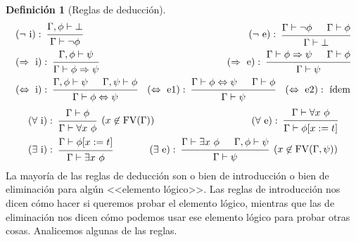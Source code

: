 \documentclass[a4paper, 12pt]{report}
\newcommand{\Ra}{\Rightarrow}
\newcommand{\te}{\text}
\newcommand{\Lra}{\Leftrightarrow}
\theoremstyle{definition}
\newtheorem{definicion}[teorema]{Definición}
\begin{document}
\begin{definicion}[Reglas de deducción]
\begin{align*}
	&(\lnot\te{ i}):~\begin{prooftree}
		\hypo{\Gamma,\phi\vdash\bot}\infer1{\Gamma\vdash\lnot\phi}
	\end{prooftree}&(\lnot\te{ e}):~\begin{prooftree}
		\hypo{\Gamma\vdash\lnot\phi}\hypo{\Gamma\vdash\phi}\infer2{\Gamma\vdash\bot}
	\end{prooftree}\\
	&(\Ra\te{ i}):~\begin{prooftree}
		\hypo{\Gamma,\phi\vdash\psi}\infer1{\Gamma\vdash\phi\Ra\psi}
	\end{prooftree}&(\Ra\te{ e}):~\begin{prooftree}
		\hypo{\Gamma\vdash\phi\Ra\psi}\hypo{\Gamma\vdash\phi}\infer2{\Gamma\vdash\psi}
	\end{prooftree}\\
	&(\Lra\te{ i}):~\begin{prooftree}
		\hypo{\Gamma,\phi\vdash\psi}\hypo{\Gamma,\psi\vdash\phi}
		\infer2{\Gamma\vdash\phi\Lra\psi}
	\end{prooftree} &(\Lra\te{ e1}):~\begin{prooftree}
		\hypo{\Gamma\vdash\phi\Lra\psi}\hypo{\Gamma\vdash\phi}
		\infer2{\Gamma\vdash\psi}
	\end{prooftree}\quad (\Lra\te{ e2}):~\te{ídem}\\
\end{align*}
\begin{align*}
	&(\forall\te{ i}):~\begin{prooftree}
		\hypo{\Gamma\vdash\phi}\infer1[($x\not\in\te{FV}(\Gamma)$)]{\Gamma\vdash\forall x~\phi}
	\end{prooftree}&(\forall\te{ e}):~\begin{prooftree}
		\hypo{\Gamma\vdash\forall x~\phi}\infer1{\Gamma\vdash\phi[x:=t]}\end{prooftree}\\
	&(\exists\te{ i}):~\begin{prooftree}
		\hypo{\Gamma\vdash\phi[x:=t]}\infer1{\Gamma\vdash\exists x~\phi}
	\end{prooftree}& \hspace{-1.5em}(\exists\te{ e}):~\begin{prooftree}
		\hypo{\Gamma\vdash\exists x~\phi}\hypo{\Gamma,\phi\vdash\psi}\infer2[($x\not\in\te{FV}(\Gamma,\psi)$)]{\Gamma\vdash\psi}
	\end{prooftree}
\end{align*}
La mayoría de las reglas de deducción son o bien de introducción o bien de eliminación para algún <<elemento lógico>>. Las reglas de introducción nos dicen cómo hacer si queremos probar el elemento lógico, mientras que las de eliminación nos dicen cómo podemos usar ese elemento lógico para probar otras cosas. Analicemos algunas de las reglas.


\end{definicion}
\end{document}
